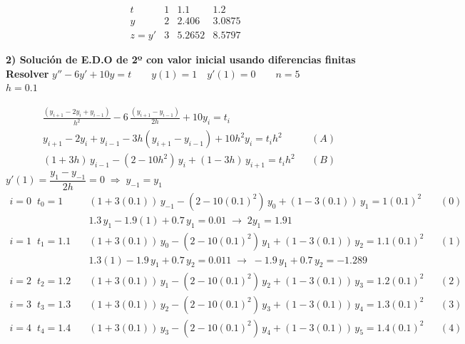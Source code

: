 \documentclass[11pt]{article}
\begin{document}
\vspace{-6pt}\[ \boxed{\begin{array}{c|ccc} t & 1 & 1.1 & 1.2\\\hline y & 2 & 2.406 & 3.0875\\ z=y' & 3 & 5.2652 & 8.5797\end{array}} \]

\newpage
{\large\textbf{2) Solución de E.D.O de 2º con valor inicial usando diferencias finitas}}\\[6pt]
\textbf{Resolver} \quad $y''-6y'+10y=t \qquad y(1)=1 \quad y'(1)=0 \qquad n=5$\\[4pt]
$h=0.1$ \hfill
{}
\begin{align*}
&\frac{(y_{i+1}-2y_i+y_{i-1})}{h^2}-6\,\frac{(y_{i+1}-y_{i-1})}{2h}+10y_i=t_i\\[4pt]
&y_{i+1}-2y_i+y_{i-1}-3h(y_{i+1}-y_{i-1})+10h^2y_i=t_ih^2 && (A)\\[4pt]
&(1+3h)\,y_{i-1}-(2-10h^2)\,y_i+(1-3h)\,y_{i+1}=t_ih^2 && (B)
\end{align*}
$y'(1)=\dfrac{y_1-y_{-1}}{2h}=0 \;\Rightarrow\; y_{-1}=y_1$
\begin{align*}
i=0 \;\; t_0=1 &\quad (1+3(0.1))\,y_{-1}-(2-10(0.1)^2)\,y_0+(1-3(0.1))\,y_1=1(0.1)^2 && (0)\\
&\quad 1.3\,y_1-1.9(1)+0.7\,y_1=0.01 \;\to\; 2y_1=1.91\\
i=1 \;\; t_1=1.1 &\quad (1+3(0.1))\,y_0-(2-10(0.1)^2)\,y_1+(1-3(0.1))\,y_2=1.1(0.1)^2 && (1)\\
&\quad 1.3(1)-1.9\,y_1+0.7\,y_2=0.011 \;\to\; -1.9\,y_1+0.7\,y_2=-1.289\\
i=2 \;\; t_2=1.2 &\quad (1+3(0.1))\,y_1-(2-10(0.1)^2)\,y_2+(1-3(0.1))\,y_3=1.2(0.1)^2 && (2)\\
i=3 \;\; t_3=1.3 &\quad (1+3(0.1))\,y_2-(2-10(0.1)^2)\,y_3+(1-3(0.1))\,y_4=1.3(0.1)^2 && (3)\\
i=4 \;\; t_4=1.4 &\quad (1+3(0.1))\,y_3-(2-10(0.1)^2)\,y_4+(1-3(0.1))\,y_5=1.4(0.1)^2 && (4)
\end{align*}
\end{document}
